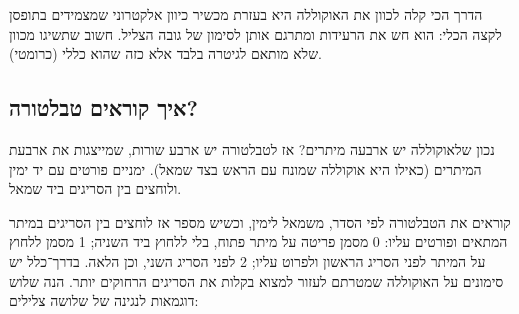 הדרך הכי קלה לכוון את האוקוללה היא בעזרת מכשיר כיוון אלקטרוני שמצמידים בתופסן לקצה הכלי: הוא חש את הרעידות ומתרגם אותן לסימון של גובה הצליל. חשוב שתשיגו מכוון שלא מותאם לגיטרה בלבד אלא כזה שהוא כללי (כרומטי).



\subsection*{איך קוראים טבלטורה?}

נכון שלאוקוללה יש ארבעה מיתרים? אז לטבלטורה יש ארבע שורות, שמייצגות את ארבעת המיתרים (כאילו היא אוקוללה שמונח עם הראש בצד שמאל). ימניים פורטים עם יד ימין ולוחצים בין הסריגים ביד שמאל.

קוראים את הטבלטורה לפי הסדר, משמאל לימין, וכשיש מספר אז לוחצים בין הסריגים במיתר המתאים ופורטים עליו: 0 מסמן פריטה על מיתר פתוח, בלי ללחוץ ביד השניה; 1 מסמן ללחוץ על המיתר לפני הסריג הראשון ולפרוט עליו; 2 לפני הסריג השני, וכן הלאה. בדרך־כלל יש סימונים על האוקוללה שמטרתם לעזור למצוא בקלות את הסריגים הרחוקים יותר. הנה שלוש דוגמאות לנגינה של שלושה צלילים:

